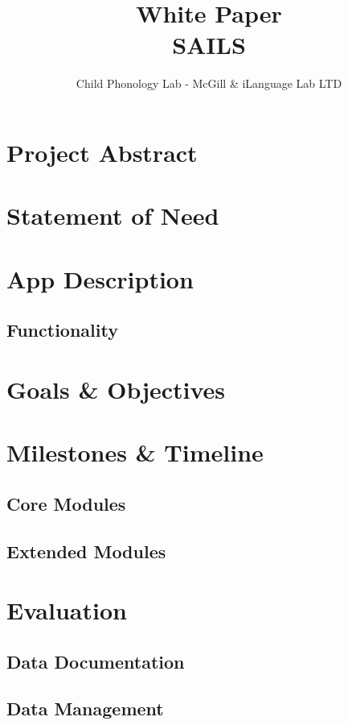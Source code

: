 \documentclass[12 pt]{article}
\title{White Paper \\ SAILS}
\author{Child Phonology Lab - McGill \& iLanguage Lab LTD}
\date{}
\begin{document}
\maketitle{} 

\tableofcontents

\section {Project Abstract}

\section {Statement of Need}

\section {App Description}

\subsection{Functionality}

\section {Goals \& Objectives}

\section {Milestones \& Timeline}

\subsection{Core Modules}

\subsection{Extended Modules}

\section {Evaluation}

\subsection {Data Documentation }

\subsection {Data Management }

\appendix
\end{document}

